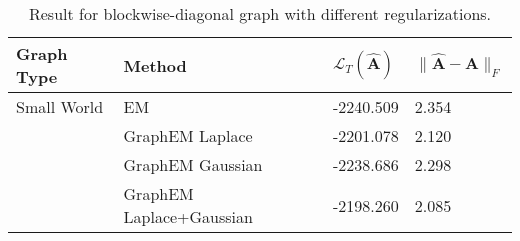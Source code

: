 \begin{table}[tb]
\caption{Result for blockwise-diagonal graph with different regularizations.}
\label{tab: prior results for block-diag}
\begin{tabular}{llll}
\toprule
\textbf{Graph Type} & \textbf{Method} & \textbf{$\mathcal{L}_T(\widehat{\mathbf{A}})$} & \textbf{$\| \widehat{\mathbf{A}} - \mathbf{A} \|_F$} \\
\midrule
Small World & EM & -2240.509 & 2.354 \\
 & GraphEM Laplace & -2201.078 & 2.120 \\
 & GraphEM Gaussian & -2238.686 & 2.298 \\
 & GraphEM Laplace+Gaussian & -2198.260 & 2.085 \\
\bottomrule
\end{tabular}
\end{table}
